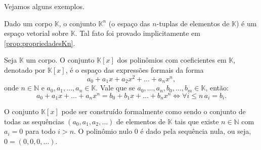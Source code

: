 Vejamos alguns exemplos.
\begin{example}
    Dado um corpo $\mathbb K$, o conjunto $\mathbb K^n$ (o espaço das $n$-tuplas de elementos de $\mathbb K$) é um espaço vetorial sobre $\mathbb K$.
    Tal fato foi provado implicitamente em \ref{prop:propriedadesKn}.
\end{example}
\begin{example}
    Seja $\mathbb K$ um corpo.
    O conjunto $\mathbb K[x]$ dos polinômios com coeficientes em $\mathbb K$, denotado por $\mathbb K[x]$, é o espaço das expressões formais da forma
    \begin{equation*}
        a_0 + a_1 x + a_2 x^2 + \dots + a_n x^n,
    \end{equation*}
    onde $n \in \mathbb N$ e $a_0, a_1, \dots, a_n \in \mathbb K$.
    Vale que se $a_0, \dots, a_n, b_0, \dots, b_m \in \mathbb K$, então:
    \begin{equation*}
        a_0 + a_1 x + \dots + a_n x^n = b_0 + b_1 x + \dots + b_n x^n \Leftrightarrow \forall i\leq n \, a_i = b_i.
    \end{equation*}

    O conjunto $\mathbb K[x]$ pode ser construído formalmente como sendo o conjunto de todas as sequências $(a_0, a_1, a_2, \dots)$ de elementos de $\mathbb K$ tais que existe $n \in \mathbb N$ com $a_i = 0$ para todo $i > n$.
    O polinômio nulo $0$ é dado pela sequência nula, ou seja, $0 = (0, 0, 0, \dots)$.


\end{example}
